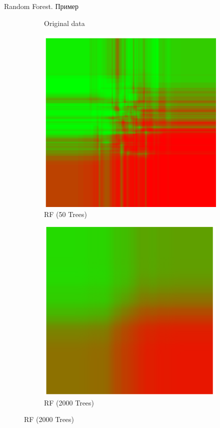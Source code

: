 \documentclass[10pt]{beamer}
\begin{document}
\begin{frame}{Random Forest. Пример}
\begin{figure}
\begin{subfigure}[b]{0.3\textwidth}
        \caption{Original data}
    \end{subfigure}
    \begin{subfigure}[b]{0.3\textwidth}
        \includegraphics[width=\textwidth]{images/rf2.png}
        \caption{RF (50 Trees)}
    \end{subfigure}
    \begin{subfigure}[b]{0.3\textwidth}
        \includegraphics[width=\textwidth]{images/rf3.png}
        \caption{RF (2000 Trees)}
    \end{subfigure}
\end{figure}
\end{frame}
\end{document}
